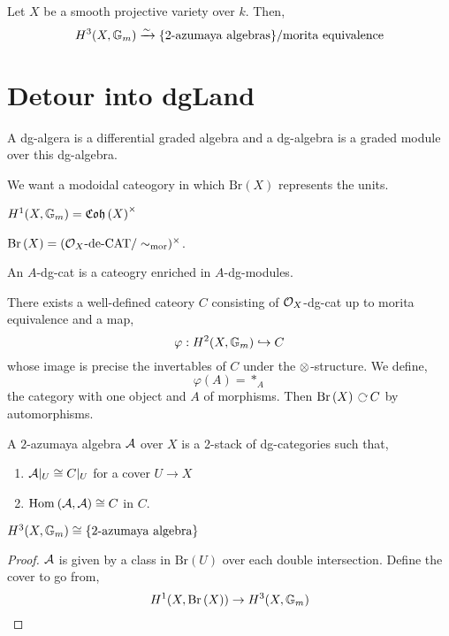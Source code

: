 \documentclass[12pt]{article}
\begin{document}
\begin{thm}[Krashen-T]
Let $X$ be a smooth projective variety over $k$. Then,
\[ H^3(X, \mathbb{G}_m) \xrightarrow{\sim} \{ 2\text{-azumaya algebras} \} / \text{morita equivalence} \]
\end{thm}

\section{Detour into dgLand}

\begin{defn}
A dg-algera is a differential graded algebra and a dg-algebra is a graded module over this dg-algebra. 
\end{defn}

\newcommand{\Br}[1]{\mathrm{Br}\left( #1 \right)}

\begin{rmk}
We want a modoidal cateogory in which $\Br{X}$ represents the units. 
\end{rmk}

\begin{example}
$H^1(X, \mathbb{G}_m) = \mathfrak{Coh}\left(X\right)^\times$
\end{example}

\begin{prop}
$\Br{X} = (\struct{X}\text{-de-CAT}/\sim_{\text{mor}})^\times$.
\end{prop}

\begin{defn}
An $A$-dg-cat is a cateogry enriched in $A$-dg-modules.
\end{defn}

\begin{thm}
There exists a well-defined cateory $C$ consisting of $\mathcal{O}_{X}$-dg-cat up to morita equivalence and a map,
\[ \varphi : H^2(X, \mathbb{G}_m) \hookrightarrow C \]
whose image is precise the invertables of $C$ under the $\otimes$-structure. We define,
\[ \varphi(A) = *_A \]
the category with one object and $A$ of morphisms. Then $\Br{X} \acts C$ by automorphisms.
\end{thm}

\begin{defn}
A $2$-azumaya algebra $\mathcal{A}$ over $X$ is a 2-stack of dg-categories such that,
\begin{enumerate}
\item $\mathcal{A}|_U \cong C|_U$ for a cover $U \to X$
\item $\mathrm{Hom}_{} \left( \mathcal{A}, \mathcal{A} \right) \cong C$ in $C$.
\end{enumerate}
\end{defn}

\begin{prop}
$H^3(X, \mathbb{G}_m) \cong \{ 2 \text{-azumaya algebra} \}$
\end{prop}

\begin{proof}
$\mathcal{A}$ is given by a class in $\Br{U}$ over each  double intersection. Define the cover to go from,
\[ H^1(X, \Br{X}) \to H^3(X, \Gm) \]
\end{proof}
\end{document}
